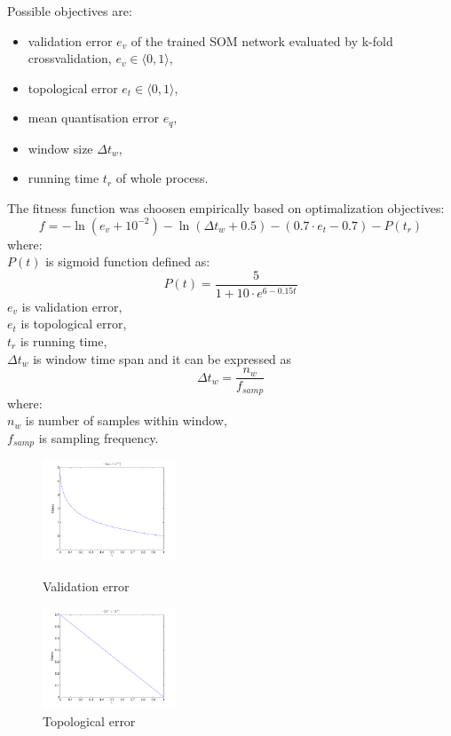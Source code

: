 \documentclass[a4paper,jurnal]{IEEEtran}
\begin{document}
Possible objectives are:%
\begin{itemize}
	\item validation error $ e_v $ of the trained SOM network evaluated by k-fold
	crossvalidation, $ e_v \in \langle 0, 1 \rangle $,
	\item topological error $ e_t \in \langle 0, 1 \rangle $,
	\item mean quantisation error $ e_q $,
	\item window size $ \Delta t_w $,
	\item running time $ t_r $ of whole process.
\end{itemize}
The fitness function was choosen empirically based on optimalization objectives:
\[ f = -\ln(e_v+10^{-2 }) - \ln(\Delta t_w+0.5) - (0.7\cdot e_t-0.7) - P(t_r) \]
where:\\
$ P(t) $ is sigmoid function defined as:
\[ P(t) = \frac{5}{1+10\cdot e^{6-0.15t}} \]
$ e_v $ is validation error,\\
$ e_t $ is topological error,\\
$ t_r $ is running time,\\
$ \Delta t_w $ is window time span and it can be expressed as 
\[  \Delta t_w = \frac{n_w}{f_{samp}}  \]
where:\\
$ n_w $ is number of samples within window,\\
$ f_{samp} $ is sampling frequency.
\\
\begin{figure}[h] %
	\centering
	\parbox{40mm}{
		\includegraphics[width=40mm]{fit_ev}
		\caption{Validation error}
		\label{fit_ev}
	}
	\qquad
	\parbox{40mm}{
		\includegraphics[width=40mm]{fit_et}
		\caption{Topological error}
		\label{fit_et}
	}
\end{figure}
\end{document}

